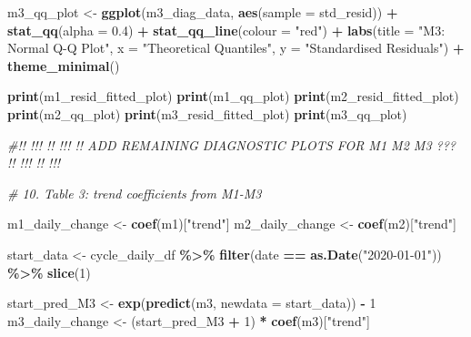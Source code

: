 \documentclass[
]{article}
\newenvironment{Shaded}{\begin{snugshade}}{\end{snugshade}}
\newcommand{\AttributeTok}[1]{\textcolor[rgb]{0.13,0.29,0.53}{#1}}
\newcommand{\CommentTok}[1]{\textcolor[rgb]{0.56,0.35,0.01}{\textit{#1}}}
\newcommand{\DecValTok}[1]{\textcolor[rgb]{0.00,0.00,0.81}{#1}}
\newcommand{\FloatTok}[1]{\textcolor[rgb]{0.00,0.00,0.81}{#1}}
\newcommand{\FunctionTok}[1]{\textcolor[rgb]{0.13,0.29,0.53}{\textbf{#1}}}
\newcommand{\NormalTok}[1]{#1}
\newcommand{\OtherTok}[1]{\textcolor[rgb]{0.56,0.35,0.01}{#1}}
\newcommand{\SpecialCharTok}[1]{\textcolor[rgb]{0.81,0.36,0.00}{\textbf{#1}}}
\newcommand{\StringTok}[1]{\textcolor[rgb]{0.31,0.60,0.02}{#1}}
\begin{document}
\begin{Shaded}
\begin{Highlighting}[]
\NormalTok{m3\_qq\_plot }\OtherTok{\textless{}{-}} \FunctionTok{ggplot}\NormalTok{(m3\_diag\_data, }\FunctionTok{aes}\NormalTok{(}\AttributeTok{sample =}\NormalTok{ std\_resid)) }\SpecialCharTok{+}
  \FunctionTok{stat\_qq}\NormalTok{(}\AttributeTok{alpha =} \FloatTok{0.4}\NormalTok{) }\SpecialCharTok{+}
  \FunctionTok{stat\_qq\_line}\NormalTok{(}\AttributeTok{colour =} \StringTok{"red"}\NormalTok{) }\SpecialCharTok{+}
  \FunctionTok{labs}\NormalTok{(}\AttributeTok{title =} \StringTok{"M3: Normal Q{-}Q Plot"}\NormalTok{,}
       \AttributeTok{x =} \StringTok{"Theoretical Quantiles"}\NormalTok{, }\AttributeTok{y =} \StringTok{"Standardised Residuals"}\NormalTok{) }\SpecialCharTok{+}
  \FunctionTok{theme\_minimal}\NormalTok{()}

\FunctionTok{print}\NormalTok{(m1\_resid\_fitted\_plot)}
\FunctionTok{print}\NormalTok{(m1\_qq\_plot)}
\FunctionTok{print}\NormalTok{(m2\_resid\_fitted\_plot)}
\FunctionTok{print}\NormalTok{(m2\_qq\_plot)}
\FunctionTok{print}\NormalTok{(m3\_resid\_fitted\_plot)}
\FunctionTok{print}\NormalTok{(m3\_qq\_plot)}

\CommentTok{\#!! !!! !! !!! !! ADD REMAINING DIAGNOSTIC PLOTS FOR M1 M2 M3 ??? !! !!! !! !!!}

\CommentTok{\# 10. Table 3: trend coefficients from M1{-}M3}

\NormalTok{m1\_daily\_change }\OtherTok{\textless{}{-}} \FunctionTok{coef}\NormalTok{(m1)[}\StringTok{"trend"}\NormalTok{]}
\NormalTok{m2\_daily\_change }\OtherTok{\textless{}{-}} \FunctionTok{coef}\NormalTok{(m2)[}\StringTok{"trend"}\NormalTok{]}

\NormalTok{start\_data }\OtherTok{\textless{}{-}}\NormalTok{ cycle\_daily\_df }\SpecialCharTok{\%\textgreater{}\%}
  \FunctionTok{filter}\NormalTok{(date }\SpecialCharTok{==} \FunctionTok{as.Date}\NormalTok{(}\StringTok{"2020{-}01{-}01"}\NormalTok{)) }\SpecialCharTok{\%\textgreater{}\%}
  \FunctionTok{slice}\NormalTok{(}\DecValTok{1}\NormalTok{)}

\NormalTok{start\_pred\_M3 }\OtherTok{\textless{}{-}} \FunctionTok{exp}\NormalTok{(}\FunctionTok{predict}\NormalTok{(m3, }\AttributeTok{newdata =}\NormalTok{ start\_data)) }\SpecialCharTok{{-}} \DecValTok{1}
\NormalTok{m3\_daily\_change }\OtherTok{\textless{}{-}}\NormalTok{ (start\_pred\_M3 }\SpecialCharTok{+} \DecValTok{1}\NormalTok{) }\SpecialCharTok{*} \FunctionTok{coef}\NormalTok{(m3)[}\StringTok{"trend"}\NormalTok{]}


\end{Highlighting}
\end{Shaded}
\end{document}

